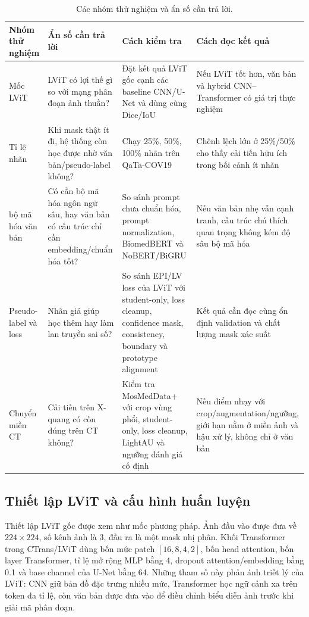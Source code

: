 \begin{table}[H]
  \centering
  \caption{Các nhóm thử nghiệm và ẩn số cần trả lời.}
  \label{tab:experiment-questions}
  \small
  \renewcommand{\arraystretch}{1.16}
  \setlength{\tabcolsep}{4pt}
  \begin{tabularx}{\textwidth}{@{}p{} Y Y Y@{}}
    \toprule
    Nhóm thử nghiệm & Ẩn số cần trả lời & Cách kiểm tra & Cách đọc kết quả \\
    \midrule
    Mốc LViT & LViT có lợi thế gì so với mạng phân đoạn ảnh thuần? & Đặt kết quả LViT gốc cạnh các baseline CNN/U-Net và dùng cùng Dice/IoU & Nếu LViT tốt hơn, văn bản và hybrid CNN--Transformer có giá trị thực nghiệm \\
    Tỉ lệ nhãn & Khi mask thật ít đi, hệ thống còn học được nhờ văn bản/pseudo-label không? & Chạy 25\%, 50\%, 100\% nhãn trên QaTa-COV19 & Chênh lệch lớn ở 25\%/50\% cho thấy cải tiến hữu ích trong bối cảnh ít nhãn \\
    bộ mã hóa văn bản & Có cần bộ mã hóa ngôn ngữ sâu, hay văn bản có cấu trúc chỉ cần embedding/chuẩn hóa tốt? & So sánh prompt chưa chuẩn hóa, prompt normalization, BiomedBERT và NoBERT/BiGRU & Nếu văn bản nhẹ vẫn cạnh tranh, cấu trúc chú thích quan trọng không kém độ sâu bộ mã hóa \\
    Pseudo-label và loss & Nhãn giả giúp học thêm hay làm lan truyền sai số? & So sánh EPI/LV loss của LViT với student-only, loss cleanup, confidence mask, consistency, boundary và prototype alignment & Kết quả cần đọc cùng ổn định validation và chất lượng mask xác suất \\
    Chuyển miền CT & Cải tiến trên X-quang có còn đúng trên CT không? & Kiểm tra MosMedData+ với crop vùng phổi, student-only, loss cleanup, LightAU và ngưỡng đánh giá cố định & Nếu điểm nhạy với crop/augmentation/ngưỡng, giới hạn nằm ở miền ảnh và hậu xử lý, không chỉ ở văn bản \\
    \bottomrule
  \end{tabularx}
\end{table}
\FloatBarrier

\subsection{Thiết lập LViT và cấu hình huấn luyện}

Thiết lập LViT gốc được xem như mốc phương pháp. Ảnh đầu vào được đưa về \(224\times224\), số kênh ảnh là 3, đầu ra là một mask nhị phân. Khối Transformer trong CTrans/LViT dùng bốn mức patch \([16,8,4,2]\), bốn head attention, bốn layer Transformer, tỉ lệ mở rộng MLP bằng 4, dropout attention/embedding bằng 0.1 và base channel của U-Net bằng 64. Những tham số này phản ánh triết lý của LViT: CNN giữ bản đồ đặc trưng nhiều mức, Transformer học ngữ cảnh xa trên token đa tỉ lệ, còn văn bản được đưa vào để điều chỉnh biểu diễn ảnh trước khi giải mã phân đoạn.

